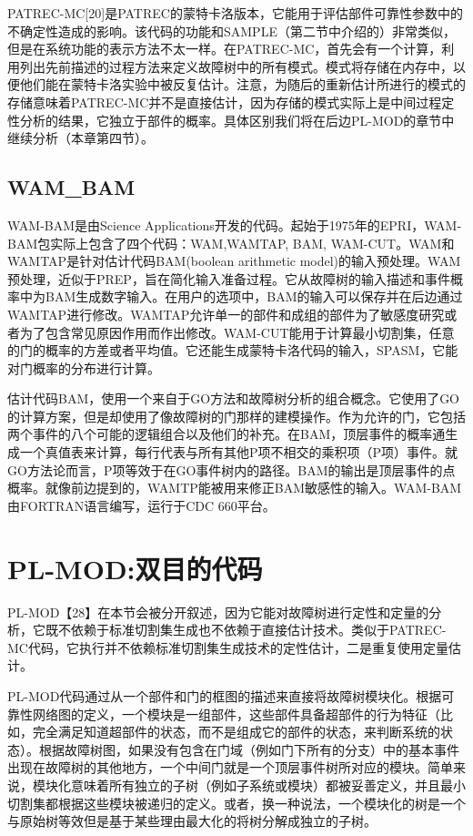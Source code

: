\documentclass[cn,11pt,chinese]{elegantbook}
\begin{document}
{PATREC-MC[20]是PATREC的蒙特卡洛版本，它能用于评估部件可靠性参数中的不确定性造成的影响。该代码的功能和SAMPLE（第二节中介绍的）非常类似，但是在系统功能的表示方法不太一样。在PATREC-MC，首先会有一个计算，利用列出先前描述的过程方法来定义故障树中的所有模式。模式将存储在内存中，以便他们能在蒙特卡洛实验中被反复估计。注意，为随后的重新估计所进行的模式的存储意味着PATREC-MC并不是直接估计，因为存储的模式实际上是中间过程定性分析的结果，它独立于部件的概率。具体区别我们将在后边PL-MOD的章节中继续分析（本章第四节）。

\subsection{WAM\_BAM}\label{ss12-4-6}

WAM-BAM是由Science Applications开发的代码。起始于1975年的EPRI，WAM-BAM包实际上包含了四个代码：WAM,WAMTAP, BAM, WAM-CUT。WAM和WAMTAP是针对估计代码BAM(boolean arithmetic model)的输入预处理。WAM预处理，近似于PREP，旨在简化输入准备过程。它从故障树的输入描述和事件概率中为BAM生成数字输入。在用户的选项中，BAM的输入可以保存并在后边通过WAMTAP进行修改。WAMTAP允许单一的部件和成组的部件为了敏感度研究或者为了包含常见原因作用而作出修改。WAM-CUT能用于计算最小切割集，任意的门的概率的方差或者平均值。它还能生成蒙特卡洛代码的输入，SPASM，它能对门概率的分布进行计算。

估计代码BAM，使用一个来自于GO方法和故障树分析的组合概念。它使用了GO的计算方案，但是却使用了像故障树的门那样的建模操作。作为允许的门，它包括两个事件的八个可能的逻辑组合以及他们的补充。在BAM，顶层事件的概率通生成一个真值表来计算，每行代表与所有其他P项不相交的乘积项（P项）事件。就GO方法论而言，P项等效于在GO事件树内的路径。BAM的输出是顶层事件的点概率。就像前边提到的，WAMTP能被用来修正BAM敏感性的输入。WAM-BAM由FORTRAN语言编写，运行于CDC 660平台。

\section{PL-MOD:双目的代码}

PL-MOD【28】在本节会被分开叙述，因为它能对故障树进行定性和定量的分析，它既不依赖于标准切割集生成也不依赖于直接估计技术。类似于PATREC-MC代码，它执行并不依赖标准切割集生成技术的定性估计，二是重复使用定量估计。

PL-MOD代码通过从一个部件和门的框图的描述来直接将故障树模块化。根据可靠性网络图的定义，一个模块是一组部件，这些部件具备超部件的行为特征（比如，完全满足知道超部件的状态，而不是组成它的部件的状态，来判断系统的状态）。根据故障树图，如果没有包含在门域（例如门下所有的分支）中的基本事件出现在故障树的其他地方，一个中间门就是一个顶层事件树所对应的模块。简单来说，模块化意味着所有独立的子树（例如子系统或模块）都被妥善定义，并且最小切割集都根据这些模块被递归的定义。或者，换一种说法，一个模块化的树是一个与原始树等效但是基于某些理由最大化的将树分解成独立的子树。

}
\end{document}
